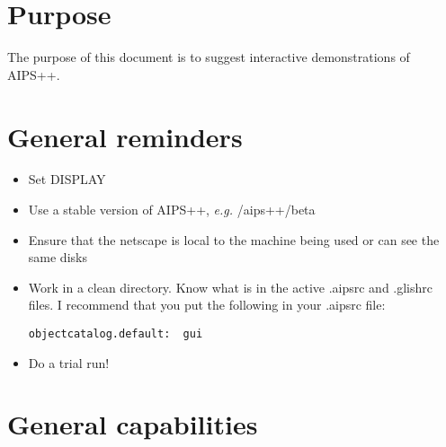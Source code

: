 \newcommand{\thisdocURL}{http://aips2.nrao.edu/aips++/docs/notes/202/202.html}
\newcommand{\searchURL}{../../html/aips2search.html}
\newcommand{\aipsviewURL}{../../user/aipsview/aipsview.html}
\newcommand{\GlishmanualURL}{../../reference/Glish/Glish.html}
\newcommand{\GlishtutorialURL}{../../notes/195/195.html}
\newcommand{\synthesisURL}{../../user/synthesis/synthesis.html}
\newcommand{\gsURL}{../../user/gettingstarted/gettingstarted.html}
\newcommand{\userrefmanualURL}{../../user/Refman/Refman.html}
\newcommand{\specsURL}{../../specs/specs.html}
\newcommand{\betaURL}{../beta/beta.html}
\newcommand{\consortiumURL}{../consortium.html}
%
%

%


\section{Purpose}

The purpose of this document is to suggest interactive demonstrations
of AIPS++.

\section{General reminders}

\begin{itemize}
\item Set DISPLAY
\item Use a stable version of AIPS++, {\em e.g.} /aips++/beta
\item Ensure that the netscape is local to the machine being used or
can see the same disks
\item Work in a clean directory. Know what is in the active .aipsrc
and .glishrc files. I recommend that you put the following in your
.aipsrc file:
\begin{verbatim}
objectcatalog.default:	gui
\end{verbatim}
\item Do a trial run!
\end{itemize}

\section{General capabilities}

